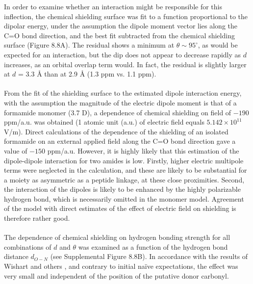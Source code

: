 \begin{doublespace}
In order to examine whether an \npipistar{} interaction might be responsible
for this inflection, the chemical shielding surface was fit to a function
proportional to the dipolar energy, under the assumption the dipole moment
vector lies along the C=O bond direction, and the best fit subtracted from the
chemical shielding surface (Figure 8.8A). The residual shows a
minimum at $\theta \sim 95^\circ$, as would be expected for an \npipistar{}
interaction, but the dip does not appear to decrease rapidly as $d$ increases,
as an orbital overlap term would. In fact, the residual is slightly larger at
$d$ = 3.3 \r{A} than at 2.9 \r{A} (1.3 ppm vs. 1.1 ppm).
\\\\
From the fit of the shielding surface to the estimated dipole interaction
energy, with the assumption the magnitude of the electric dipole moment is
that of a formamide monomer (3.7 D), a dependence of chemical shielding on
field of $-190$ ppm/a.u. was obtained (1 atomic unit (a.u.) of electric field
equals $5.142\times10^{11}$ V/m). Direct calculations of the dependence of the
shielding of an isolated formamide on an external applied field along the C=O
bond direction gave a value of $-150$ ppm/a.u. However, it is highly likely
that this estimation of the dipole-dipole interaction for two amides is low.
Firstly, higher electric multipole terms were neglected in the calculation,
and these are likely to be substantial for a moiety as asymmetric as a peptide
linkage, at these close proximities. Second, the interaction of the dipoles
is likely to be enhanced by the highly polarizable hydrogen bond, which is
necessarily omitted in the monomer model. Agreement of the model with direct
estimates of the effect of electric field on shielding is therefore rather
good.
\\\\
The dependence of chemical shielding on hydrogen bonding strength for all
combinations of $d$ and $\theta$ was examined as a function of the hydrogen
bond distance $d_{O-N}$ (see Supplemental Figure 8.8B). In accordance with the
results of Wishart and others
\cite{cisnetti:cpc2004,neal:jbnmr2003,markwick:jacs2004}, and contrary
to initial na\"{i}ve expectations, the effect was very small and independent of
the position of the putative \npipistar{} donor carbonyl.
\end{doublespace}

